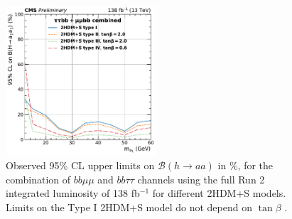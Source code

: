   \begin{figure}[h!]
    \begin{center}
      \includegraphics[width=0.5\textwidth]{figures/ch-10-results/HAA_comb_all_prelim.pdf}
    \end{center}
    \caption[Observed 95\% CL upper limits on $\mathcal{B}(h\to aa)$ in \%, for the combination of $bb\mu\mu$ and $bb\tau\tau$ channels using the full Run 2 integrated luminosity of 138 fb$^{-1}$ for different 2HDM+S models.]{Observed 95\% CL upper limits on $\mathcal{B}(h\to aa)$ in \%, for the combination of $bb\mu\mu$ and $bb\tau\tau$ channels using the full Run 2 integrated luminosity of 138 fb$^{-1}$ for different 2HDM+S models. Limits on the Type I 2HDM+S model do not depend on $\tan\beta$ \cite{CMS-AN-20-213}.}
      \label{fig:results_limits_combined}
  \end{figure}
  


